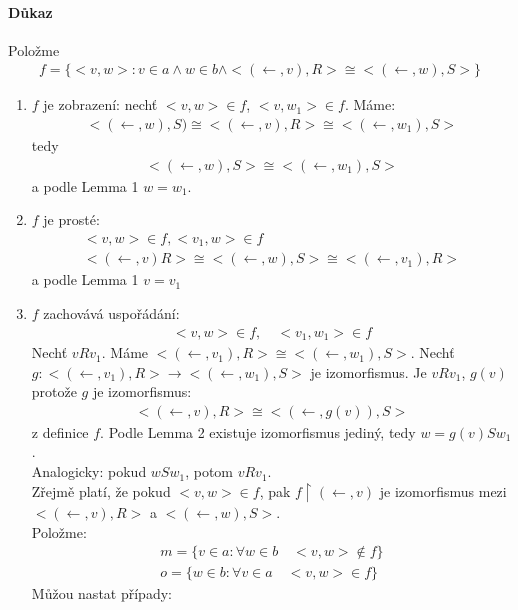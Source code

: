 \documentclass[a4paper,12pt,titlepage]{article}
\begin{document}
\paragraph{Důkaz}
Položme 
\begin{align}
f = \{ <v,w> : v \in a \land w \in b \land <(\leftarrow,v), R> \cong <(\leftarrow, w), S>\}
\end{align}
\begin{enumerate}
\item
$f$ je zobrazení: nechť $<v,w> \in f$, $<v,w_1> \in f$.
Máme:
\begin{align}
	<(\leftarrow, w), S) \cong <(\leftarrow, v), R> \cong <(\leftarrow, w_1), S>
\end{align}
tedy 
\begin{align}
	<(\leftarrow, w), S> \cong <(\leftarrow, w_1), S>
\end{align}
a podle Lemma 1 $w = w_1$.
\item
$f$ je prosté:
\begin{align}
	<v,w> \in f, <v_1,w> \in f \\
	<(\leftarrow, v) R> \cong <(\leftarrow, w),S> \cong <(\leftarrow, v_1), R>
\end{align}
a podle Lemma 1 $v = v_1$
\item
$f$ zachovává uspořádání:
\begin{align}
	<v,w> \in f, \quad <v_1, w_1> \in f
\end{align}
Nechť $v R v_1$. Máme $<(\leftarrow, v_1), R> \cong <(\leftarrow, w_1), S>$.
Nechť $g: <(\leftarrow, v_1), R> \to <(\leftarrow, w_1),S>$ je izomorfismus. 
Je $v R v_1$, $g(v)$ protože $g$ je izomorfismus:
\begin{align}
	<(\leftarrow,v), R> \cong <(\leftarrow, g(v)), S>
\end{align}
z definice $f$. Podle Lemma 2 existuje izomorfismus jediný, tedy $w = g(v) S
w_1$. \\
Analogicky: pokud $w S w_1$, potom $v R v_1$. \\
Zřejmě platí, že pokud $<v,w> \in f$, pak $f \upharpoonright (\leftarrow, v)$ je izomorfismus
mezi \\ $<(\leftarrow,v), R>$ a $<(\leftarrow,w), S>$.\\
Položme: 
\begin{align}
	m = \{ v \in a : \forall w \in b \quad <v,w> \nin f \} \\
	o = \{ w \in b : \forall v \in a \quad <v,w> \in f \}
\end{align}
Můžou nastat případy:
\begin{enumerate}

\end{enumerate}
\end{enumerate}
\end{document}
